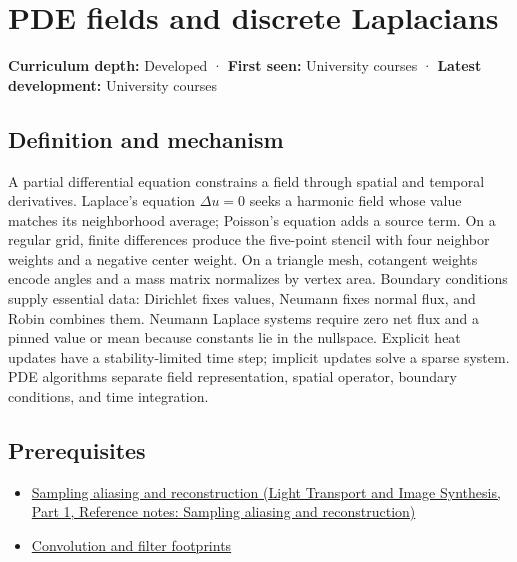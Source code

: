 \hypertarget{appendix-1988d465c119}{}\label{referencestart:appendix-1988d465c119}
\section{PDE fields and discrete Laplacians}\label{appendix-1988d465c119-pde-fields-and-discrete-laplacians}

\hypertarget{appendix-1988d465c119-pde-fields-and-discrete-laplacians}{}

\textbf{Curriculum depth:} Developed · \textbf{First seen:} University courses · \textbf{Latest development:} University courses

\begin{allmightroledefinition}

\subsection{Definition and mechanism}\label{appendix-1988d465c119-definition-and-mechanism}

\hypertarget{appendix-1988d465c119-definition-and-mechanism}{}

A partial differential equation constrains a field through spatial and temporal derivatives. Laplace's equation \(\Delta u=0\) seeks a harmonic field whose value matches its neighborhood average; Poisson's equation adds a source term. On a regular grid, finite differences produce the five-point stencil with four neighbor weights and a negative center weight. On a triangle mesh, cotangent weights encode angles and a mass matrix normalizes by vertex area. Boundary conditions supply essential data: Dirichlet fixes values, Neumann fixes normal flux, and Robin combines them. Neumann Laplace systems require zero net flux and a pinned value or mean because constants lie in the nullspace. Explicit heat updates have a stability-limited time step; implicit updates solve a sparse system. PDE algorithms separate field representation, spatial operator, boundary conditions, and time integration.

\end{allmightroledefinition}

\subsection{Prerequisites}\label{appendix-1988d465c119-prerequisites}

\hypertarget{appendix-1988d465c119-prerequisites}{}

\begin{itemize}
\tightlist
\item
  \href{../04-Light-Transport-and-Image-Synthesis-P01/main.pdf\#appendix-6a7869dd79a6}{Sampling aliasing and reconstruction (Light Transport and Image Synthesis, Part 1, Reference notes: Sampling aliasing and reconstruction)}
\item
  \hyperref[appendix-d5b3c692d9f0]{Convolution and filter footprints}
\end{itemize}

